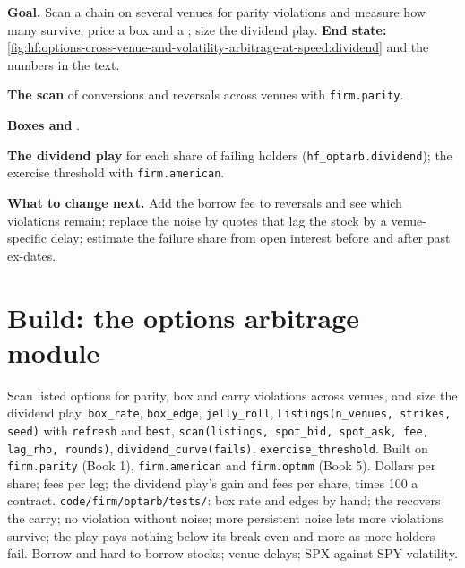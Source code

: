 \begin{tutorial}
\textbf{Goal.} Scan a chain on several venues for parity violations and measure how many survive; price a box and a ; size the dividend
play. \textbf{End state:} \cref{fig:hf:options-cross-venue-and-volatility-arbitrage-at-speed:dividend} and the numbers in the text.
\begin{tutsteps}
\item \textbf{The scan} of conversions and reversals across venues with \texttt{firm.parity}.
\label{lst:hf:options-cross-venue-and-volatility-arbitrage-at-speed:scan}
\item \textbf{Boxes and }.
\label{lst:hf:options-cross-venue-and-volatility-arbitrage-at-speed:box}
\item \textbf{The dividend play} for each share of failing holders (\texttt{hf\_optarb.dividend}); the exercise threshold with
\texttt{firm.american}.
\end{tutsteps}
\textbf{What to change next.} Add the borrow fee to reversals and see which violations remain; replace the noise by quotes that lag the stock by a
venue-specific delay; estimate the failure share from open interest before and after past ex-dates.
\end{tutorial}

\section{Build: the options arbitrage module}\label{bld:hf:options-cross-venue-and-volatility-arbitrage-at-speed:optarb}

\begin{build}
 Scan listed options for parity, box and carry violations across venues, and size the dividend play.
 \texttt{box\_rate}, \texttt{box\_edge}, \texttt{jelly\_roll}, \texttt{Listings(n\_venues, strikes, seed)} with \texttt{refresh}
and \texttt{best}, \texttt{scan(listings, spot\_bid, spot\_ask, fee, lag\_rho, rounds)}, \texttt{dividend\_curve(fails)},
\texttt{exercise\_threshold}. Built on \texttt{firm.parity} (Book 1), \texttt{firm.american} and \texttt{firm.optmm} (Book 5).
 Dollars per share; fees per leg; the dividend play's gain and fees per share, times 100 a contract.
 \texttt{code/firm/optarb/tests/}: box rate and edges by hand; the  recovers the carry; no violation without noise;
more persistent noise lets more violations survive; the play pays nothing below its break-even and more as more holders fail.
 Borrow and hard-to-borrow stocks; venue delays; SPX against SPY volatility.
\end{build}

